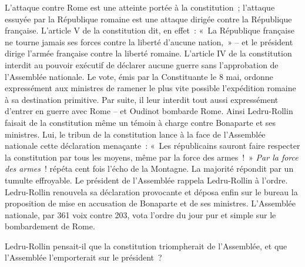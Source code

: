 \documentclass[french,twoside]{book} %
\begin{document}
L’attaque contre Rome est une atteinte portée à la constitution ; l’attaque essuyée par la République romaine est une attaque dirigée contre la République française. L’article V de la constitution dit, en effet : « La République française ne tourne jamais ses forces contre la liberté d’aucune nation, » – et le président dirige l’armée française contre la liberté romaine. L’article IV de la constitution interdit au pouvoir exécutif de déclarer aucune guerre sans l’approbation de l’Assemblée nationale. Le vote, émis par la Constituante le 8 mai, ordonne expressément aux ministres de ramener le plus vite possible l’expédition romaine à sa destination primitive. Par suite, il leur interdit tout aussi expressément d’entrer en guerre avec Rome – et Oudinot bombarde Rome. Ainsi Ledru-Rollin faisait de la constitution même un témoin à charge contre Bonaparte et ses ministres. Lui, le tribun de la constitution lance à la face de l’Assemblée nationale cette déclaration menaçante : « Les républicains sauront faire respecter la constitution par tous les moyens, même par la force des armes ! » \emph{Par la force des armes} ! répéta cent fois l’écho de la Montagne. La majorité répondit par un tumulte effroyable. Le président de l’Assemblée rappela Ledru-Rollin à l’ordre. Ledru-Rollin renouvela sa déclaration provocante et déposa enfin sur le bureau la proposition de mise en accusation de Bonaparte et de ses ministres. L’Assemblée nationale, par 361 voix contre 203, vota l’ordre du jour pur et simple sur le bombardement de Rome.\par
Ledru-Rollin pensait-il que la constitution triompherait de l’Assemblée, et que l’Assemblée l’emporterait sur le président ?\par
\end{document}
